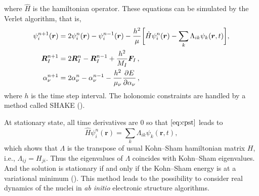 where $\hat{H}$ is the hamiltonian operator.
These equations can be simulated by the Verlet algorithm, that is,
\begin{subequations}
	\label{eq:cpeqm}
	\begin{align}
		\psi_i ^{n+1} (\bm{r}) & = 2 \psi_{i} ^ {n} (\bm{r}) -
		\psi_i ^{n-1} (\bm{r}) - \frac{ h^2 }{ \mu }
		\bigg[
			\hat{H} \psi_{i} ^ {n} (\bm{r}) - \sum_{k}
			\Lambda_{ik} \psi_k (\bm{r}, t)
			\bigg],\label{eq:cpst}\\
		\bm{R}_{I}^{n+1}       & = 2 \bm{R}_{I}^{n} - \bm{R}_{I}^{n-1} +
		\frac{ h^2 }{ M_I } \bm{F}_{I} \thinspace,\\
		\alpha_{\nu}^{n+1}     & = 2 \alpha_{\nu}^{n} -
		\alpha_{\nu}^{n-1} -
		\frac{ h^2 }{ \mu_{\nu} }
		\frac{ \partial E }{ \partial \alpha_{\nu} } \thinspace,
	\end{align}
\end{subequations}
where $h$ is the time step interval. The holonomic constraints are
handled by a method called SHAKE (\cite{Ryckaert:1977gp}).

At stationary state, all time derivatives are $0$ so that
$\eqref{eq:cpst}$ leads to
\begin{equation}
	\hat{H} \psi_{i} ^ {n} (\bm{r}) = \sum_{k}
	\Lambda_{ik} \psi_k (\bm{r}, t),
\end{equation}
which shows that $\Lambda$ is the transpose of
usual Kohn--Sham hamiltonian matrix
$H$, i.e., $\Lambda_{ij} = H_{ji}$. Thus the eigenvalues of
$\Lambda$ coincides with Kohn--Sham eigenvalues.
And the solution is stationary if and only if the Kohn--Sham
energy is at a variational minimum (\cite{martin2004electronic}).
This method leads to the possibility to consider real dynamics
of the nuclei in \textit{ab initio} electronic structure algorithms.

%
%
